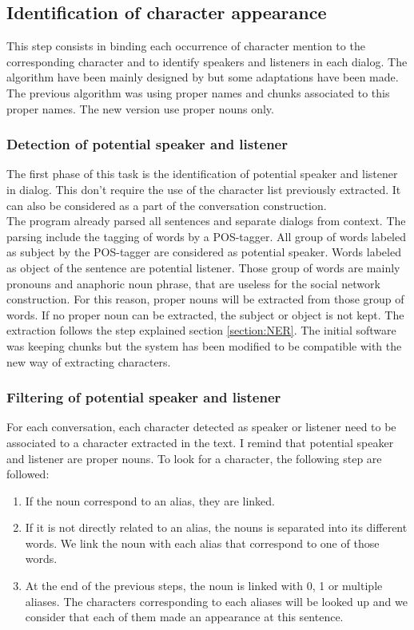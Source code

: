\documentclass[a4paper, 12pt]{report}
\begin{document}
\subsection{Identification of character appearance}
\label{identification}
This step consists in binding each occurrence of character mention to the corresponding character and to identify speakers and listeners in each dialog. The algorithm have been mainly designed by \cite{original_thesis} but some adaptations have been made. The previous algorithm was using proper names and chunks associated to this proper names. The new version use proper nouns only.\\

\subsubsection{Detection of potential speaker and listener}
The first phase of this task is the identification of potential speaker and listener in dialog. This don't require the use of the character list previously extracted. It can also be considered as a part of the conversation construction.\\

The program already parsed all sentences and separate dialogs from context. The parsing include the tagging of words by a POS-tagger. All group of words labeled as subject by the POS-tagger are considered as potential speaker. Words labeled as object of the sentence are potential listener. Those group of words are mainly pronouns and anaphoric noun phrase, that are useless for the social network construction. For this reason, proper nouns will be extracted from those group of words. If no proper noun can be extracted, the subject or object is not kept. The extraction follows the step explained section \ref{section:NER}. The initial software was keeping chunks but the system has been modified to be compatible with the new way of extracting characters.

\subsubsection{Filtering of potential speaker and listener}
\label{filtering}
For each conversation, each character detected as speaker or listener need to be associated to a character extracted in the text. I remind that potential speaker and listener are proper nouns. To look for a character, the following step are followed:\\
\begin{enumerate}
\item If the noun correspond to an alias, they are linked.
\item If it is not directly related to an alias, the nouns is separated into its different words. We link the noun with each alias that correspond to one of those words.
\item At the end of the previous steps, the noun is linked with 0, 1 or multiple aliases. The characters corresponding to each aliases will be looked up and we consider that each of them made an appearance at  this sentence.
\end{enumerate}
\end{document}
